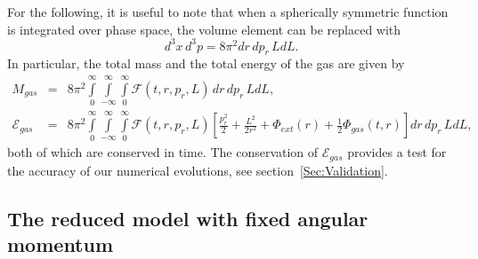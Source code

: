 For the following, it is useful to note that when a spherically symmetric function is integrated over phase space, the volume element can be replaced with
\begin{equation}
d^3 x\, d^3 p = 8\pi^2 dr\, dp_r\, L dL.
\label{Eq:PSVolumeForm}
\end{equation}
In particular, the total mass and the total energy of the gas are given by
\begin{eqnarray}
M_{gas} &=& 8\pi^2\int\limits_0^\infty\int\limits_{-\infty}^\infty\int\limits_0^\infty \mathcal{F}(t,r,p_r,L)\, dr\, dp_r\, L dL,
\label{Eq:Mgas}\\
\mathcal{E}_{gas} &=& 8\pi^2\int\limits_0^\infty\int\limits_{-\infty}^\infty\int\limits_0^\infty \mathcal{F}(t,r,p_r,L)\left[ \frac{p_r^2}{2} + \frac{L^2}{2r^2} + \Phi_{ext}(r) + \frac{1}{2}\Phi_{gas}(t,r) \right] dr\, dp_r\, L dL,
\label{Eq:Egas}
\end{eqnarray}
both of which are conserved in time. The conservation of $\mathcal{E}_{gas}$ provides a test for the accuracy of our numerical evolutions, see section~\ref{Sec:Validation}.


\subsection{The reduced model with fixed angular momentum}
\label{SubSec:FixedL}


